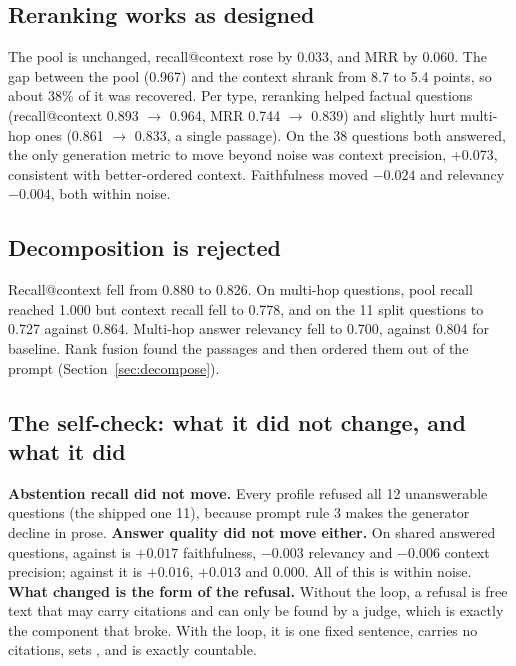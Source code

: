 \subsection{Reranking works as designed}
\label{sec:res-rerank}

The pool is unchanged, recall@context rose by 0.033, and MRR by 0.060. The gap between the pool (0.967) and the context shrank from 8.7 to 5.4 points, so about 38\% of it was recovered. Per type, reranking helped factual questions (recall@context 0.893 $\rightarrow$ 0.964, MRR 0.744 $\rightarrow$ 0.839) and slightly hurt multi-hop ones (0.861 $\rightarrow$ 0.833, a single passage). On the 38 questions both answered, the only generation metric to move beyond noise was context precision, +0.073, consistent with better-ordered context. Faithfulness moved $-0.024$ and relevancy $-0.004$, both within noise.

\subsection{Decomposition is rejected}
\label{sec:res-decompose}

Recall@context fell from 0.880 to 0.826. On multi-hop questions, pool recall reached 1.000 but context recall fell to 0.778, and on the 11 split questions to 0.727 against 0.864. Multi-hop answer relevancy fell to 0.700, against 0.804 for baseline. Rank fusion found the passages and then ordered them out of the prompt (Section~\ref{sec:decompose}).

\subsection{The self-check: what it did not change, and what it did}
\label{sec:res-corrective}

\begin{keyidea}
\textbf{Abstention recall did not move.} Every profile refused all 12 unanswerable questions (the shipped one 11), because prompt rule 3 makes the generator decline in prose. \textbf{Answer quality did not move either.} On shared answered questions,  against  is $+0.017$ faithfulness, $-0.003$ relevancy and $-0.006$ context precision; against  it is $+0.016$, $+0.013$ and $0.000$. All of this is within noise. \textbf{What changed is the form of the refusal.} Without the loop, a refusal is free text that may carry citations and can only be found by a judge, which is exactly the component that broke. With the loop, it is one fixed sentence, carries no citations, sets , and is exactly countable.
\end{keyidea}

